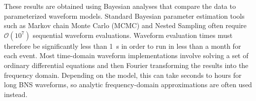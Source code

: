 \documentclass[prd,aps,letter,twocolumn,floatfix,notitlepage,nofootinbib]{revtex4-1}
\newcommand{\MP}[1]{{\textcolor{blue}{\texttt{MP: #1}} }}
\newcommand{\red}[1]{\textcolor{red}{#1}}
\begin{document}


These results are obtained using Bayesian analyses that compare the data to parameterized waveform models. Standard Bayesian parameter estimation tools such as Markov chain Monte Carlo (MCMC) and Nested Sampling often require $\mathcal{O}(10^7)$ sequential waveform evaluations. Waveform evaluation times must therefore be significantly less than 1~s in order to run in less than a month for each event. Most time-domain waveform implementations involve solving a set of ordinary differential equations and then Fourier transforming the results into the frequency domain. Depending on the model, this can take seconds to hours for long BNS waveforms, so analytic frequency-domain approximations are often used instead. 

\end{document}
